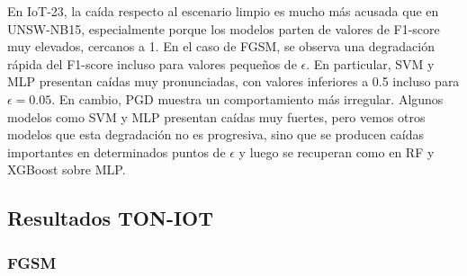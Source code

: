 \begin{table}[H]
\centering
\caption{F1-score de la clase ataque ante perturbaciones generadas sobre el modelo CNN}
\label{tab:f1_perturbacion_cnn_3}
\end{table}

En IoT-23, la caída respecto al escenario limpio es mucho más acusada que en UNSW-NB15, especialmente porque los modelos parten de valores de F1-score muy elevados, cercanos a 1. En el caso de FGSM, se observa una degradación rápida del F1-score incluso para valores pequeños de $\epsilon$. En particular, SVM y MLP presentan caídas muy pronunciadas, con valores inferiores a 0.5 incluso para $\epsilon = 0.05$.
En cambio, PGD muestra un comportamiento más irregular. Algunos modelos como SVM y MLP presentan caídas muy fuertes, pero vemos otros modelos que esta degradación no es progresiva, sino que se producen caídas importantes en determinados puntos de $\epsilon$ y luego se recuperan como en RF y XGBoost sobre MLP.

\subsection{Resultados TON-IOT}

\subsubsection{FGSM}

